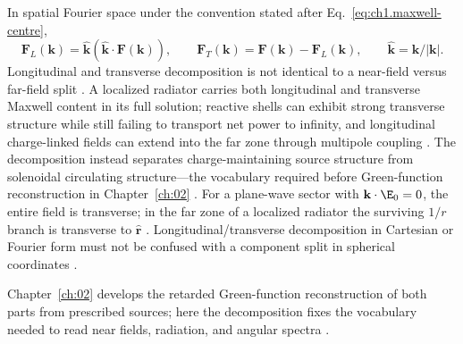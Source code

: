 In spatial Fourier space under the convention stated after Eq.~\eqref{eq:ch1.maxwell-centre},
\begin{equation}
\label{eq:ch1.fourier-long-trans}
\mathbf{F}_L(\mathbf{k})=\hat{\mathbf{k}}(\hat{\mathbf{k}}\cdot\mathbf{F}(\mathbf{k})),
\qquad
\mathbf{F}_T(\mathbf{k})=\mathbf{F}(\mathbf{k})-\mathbf{F}_L(\mathbf{k}),
\qquad
\hat{\mathbf{k}}=\mathbf{k}/|\mathbf{k}|.
\end{equation}
Longitudinal and transverse decomposition is not identical to a near-field versus far-field split \cite{stratton1941,jackson1999}. A localized radiator carries both longitudinal and transverse Maxwell content in its full solution; reactive shells can exhibit strong transverse structure while still failing to transport net power to infinity, and longitudinal charge-linked fields can extend into the far zone through multipole coupling \cite{stratton1941,poynting1884}. The decomposition instead separates charge-maintaining source structure from solenoidal circulating structure---the vocabulary required before Green-function reconstruction in Chapter~\ref{ch:02} \cite{tai1994}. For a plane-wave sector with $\mathbf{k}\cdot\E_0=0$, the entire field is transverse; in the far zone of a localized radiator the surviving $1/r$ branch is transverse to $\hat{\mathbf{r}}$ \cite{stratton1941}. Longitudinal/transverse decomposition in Cartesian or Fourier form must not be confused with a component split in spherical coordinates \cite{stratton1941,harrington2001}.


Chapter~\ref{ch:02} develops the retarded Green-function reconstruction of both parts from prescribed sources; here the decomposition fixes the vocabulary needed to read near fields, radiation, and angular spectra \cite{stratton1941,tai1994}.
